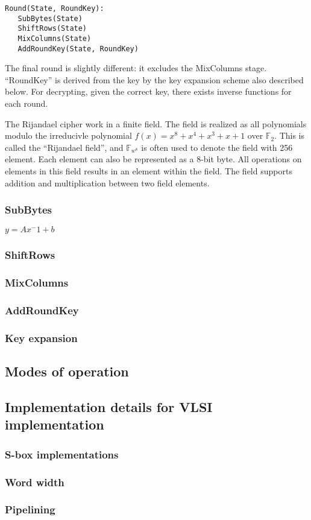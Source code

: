 \begin{verbatim}
Round(State, RoundKey):
   SubBytes(State)
   ShiftRows(State)
   MixColumns(State)
   AddRoundKey(State, RoundKey)
\end{verbatim}

The final round is slightly different: it excludes the MixColumns
stage. ``RoundKey'' is derived from the key by the key expansion
scheme also described below. For decrypting, given the correct key,
there exists inverse functions for each round.

The Rijandael cipher work in a finite field. The field is realized as
all polynomials modulo the irreducivle polynomial $f(x) = x^8 + x^4 +
x^3 + x + 1$ over $\mathbb{F}_2$. This is called the ``Rijandael
field'', and $\mathbb{F}_{w^8}$ is often used to denote the field with
256 element. Each element can also be represented as a 8-bit byte. All
operations on elements in this field results in an element within the
field. The field supports addition and multiplication between two
field elements.

\subsubsection{SubBytes}

$y = A x^-1 + b$

\subsubsection{ShiftRows}



\subsubsection{MixColumns}

\subsubsection{AddRoundKey}

\subsubsection{Key expansion}

\subsection{Modes of operation}

\subsection{Implementation details for VLSI implementation}

\subsubsection{S-box implementations}

\subsubsection{Word width}


\subsubsection{Pipelining}



